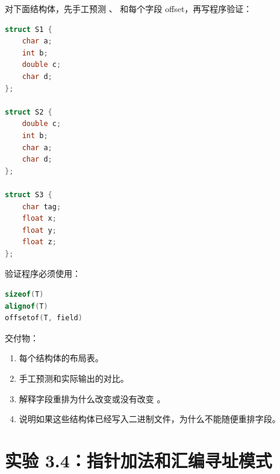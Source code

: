 \begin{labbox}
对下面结构体，先手工预测 、 和每个字段 offset，再写程序验证：

\begin{lstlisting}[language=C++]
struct S1 {
    char a;
    int b;
    double c;
    char d;
};

struct S2 {
    double c;
    int b;
    char a;
    char d;
};

struct S3 {
    char tag;
    float x;
    float y;
    float z;
};
\end{lstlisting}

验证程序必须使用：

\begin{lstlisting}[language=C++]
sizeof(T)
alignof(T)
offsetof(T, field)
\end{lstlisting}

交付物：

\begin{enumerate}
  \item 每个结构体的布局表。
  \item 手工预测和实际输出的对比。
  \item 解释字段重排为什么改变或没有改变 。
  \item 说明如果这些结构体已经写入二进制文件，为什么不能随便重排字段。
\end{enumerate}
\end{labbox}

\section{实验 3.4：指针加法和汇编寻址模式}

